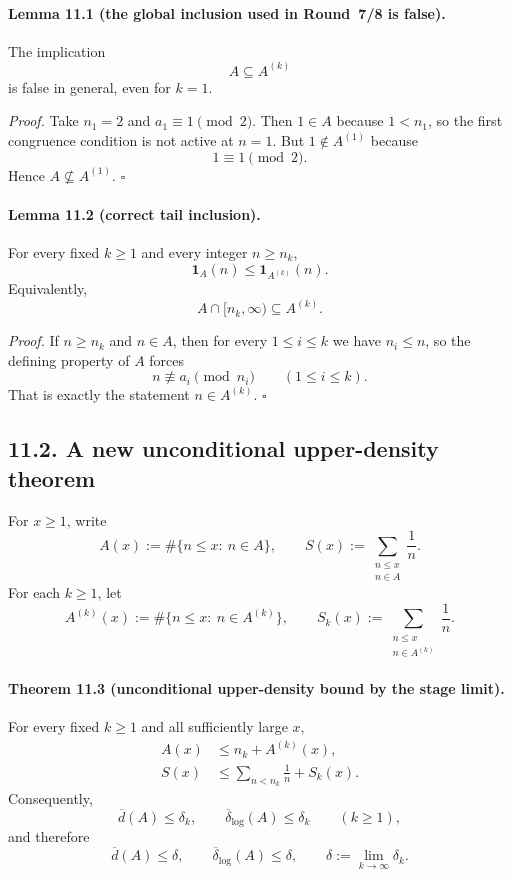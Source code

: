 \paragraph{Lemma 11.1 (the global inclusion used in Round~7/8 is false).}
The implication
\[
A\subseteq A^{(k)}
\]
is false in general, even for $k=1$.

\emph{Proof.}
Take $n_1=2$ and $a_1\equiv 1\pmod 2$.  Then $1\in A$ because $1<n_1$, so the first congruence condition is not active at $n=1$.  But $1\notin A^{(1)}$ because
\[
1\equiv 1\pmod 2.
\]
Hence $A\not\subseteq A^{(1)}$. \hfill $\square$

\paragraph{Lemma 11.2 (correct tail inclusion).}
For every fixed $k\ge 1$ and every integer $n\ge n_k$,
\begin{equation}
\mathbf 1_A(n)\le \mathbf 1_{A^{(k)}}(n).
\tag{11.2}
\end{equation}
Equivalently,
\begin{equation}
A\cap[n_k,\infty)\subseteq A^{(k)}.
\tag{11.3}
\end{equation}

\emph{Proof.}
If $n\ge n_k$ and $n\in A$, then for every $1\le i\le k$ we have $n_i\le n$, so the defining property of $A$ forces
\[
n\not\equiv a_i\pmod{n_i}
\qquad (1\le i\le k).
\]
That is exactly the statement $n\in A^{(k)}$. \hfill $\square$

\subsection*{11.2. A new unconditional upper-density theorem}
For $x\ge 1$, write
\[
A(x):=\#\{n\le x:\ n\in A\},
\qquad
S(x):=\sum_{\substack{n\le x\\ n\in A}}\frac1n.
\]
For each $k\ge 1$, let
\[
A^{(k)}(x):=\#\{n\le x:\ n\in A^{(k)}\},
\qquad
S_k(x):=\sum_{\substack{n\le x\\ n\in A^{(k)}}}\frac1n.
\]

\paragraph{Theorem 11.3 (unconditional upper-density bound by the stage limit).}
For every fixed $k\ge 1$ and all sufficiently large $x$,
\begin{align}
A(x)&\le n_k+A^{(k)}(x),
\tag{11.4}\\
S(x)&\le \sum_{n<n_k}\frac1n+S_k(x).
\tag{11.5}
\end{align}
Consequently,
\begin{equation}
\overline d(A)\le \delta_k,
\qquad
\overline\delta_{\log}(A)\le \delta_k
\qquad (k\ge 1),
\tag{11.6}
\end{equation}
and therefore
\begin{equation}
\overline d(A)\le \delta,
\qquad
\overline\delta_{\log}(A)\le \delta,
\qquad
\delta:=\lim_{k\to\infty}\delta_k.
\tag{11.7}
\end{equation}

